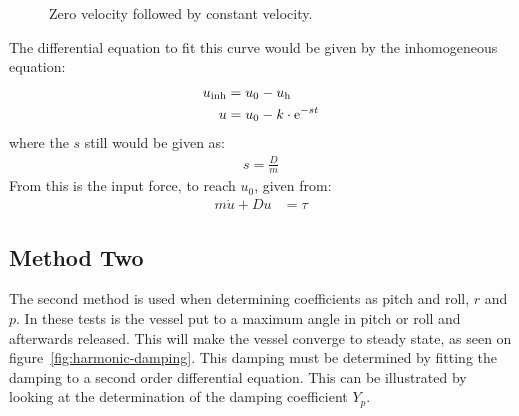 \begin{figure}[htbp]
	\centering
	
	\caption{Zero velocity followed by constant velocity.}
	\label{fig:phase1}
\end{figure}
The differential equation to fit this curve would be given by the inhomogeneous equation:
\begin{align}
u_{\text{inh}} &= u_0 - u_{\text{h}}\\
u &= u_0 - k \cdot \mathrm{e}^{-st}
\end{align}
where the $s$ still would be given as:
\begin{align}
s = \frac{D}{m}
\end{align}
From this is the input force, to reach $u_0$, given from:
\begin{align}
m \dot u + Du &= \tau
\end{align}

\subsection{Method Two}
\label{subsec:methodtwo}
The second method is used when determining coefficients as pitch and roll, $r$ and $p$. In these tests is the vessel put to a maximum angle in pitch or roll and afterwards released. This will make the vessel converge to steady state, as seen on figure~\vref{fig:harmonic-damping}. This damping must be determined by fitting the damping to a second order differential equation. This can be illustrated by looking at the determination of the damping coefficient $Y_p$.

